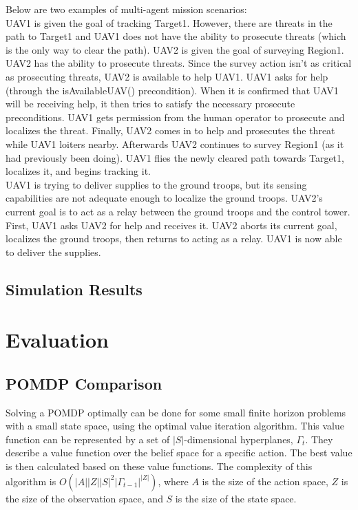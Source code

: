 \documentclass[12pt]{article}
\begin{document}
Below are two examples of multi-agent mission scenarios:\\

\noindent
UAV1 is given the goal of tracking Target1. However, there are threats in the path to Target1 and UAV1 does not have the ability to prosecute threats (which is the only way to clear the path). UAV2 is given the goal of surveying Region1. UAV2 has the ability to prosecute threats. Since the survey action isn't as critical as prosecuting threats, UAV2 is available to help UAV1.  UAV1 asks for help (through the isAvailableUAV() precondition). When it is confirmed that UAV1 will be receiving help, it then tries to satisfy the necessary prosecute preconditions. UAV1 gets permission from the human operator to prosecute and localizes the threat. Finally, UAV2 comes in to help and prosecutes the threat while UAV1 loiters nearby. Afterwards UAV2 continues to survey Region1 (as it had previously been doing). UAV1 flies the newly cleared path towards Target1, localizes it, and begins tracking it.\\

\noindent
UAV1 is trying to deliver supplies to the ground troops, but its sensing capabilities are not adequate enough to localize the ground troops. UAV2's current goal is to act as a relay between the ground troops and the control tower. First, UAV1 asks UAV2 for help and receives it. UAV2 aborts its current goal, localizes the ground troops, then returns to acting as a relay. UAV1 is now able to deliver the supplies.

\subsection{Simulation Results}

\section{Evaluation}
\subsection{POMDP Comparison}

Solving a POMDP optimally can be done for some small finite horizon problems with a small state space, using the optimal value iteration algorithm. This value function can be represented by a set of $|S|$-dimensional hyperplanes, $\Gamma_{t}$. They describe a value function over the belief space for a specific action. The best value is then calculated based on these value functions. The complexity of this algorithm is $O(|A||Z||S|^{2}|\Gamma_{t-1}|^{|Z|})$, where $A$ is the size of the action space, $Z$ is the size of the observation space, and $S$ is the size of the state space.
\end{document}
